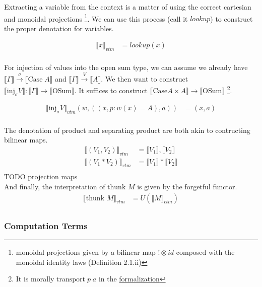\documentclass{article}
\newcommand{\den}[1]{\llbracket #1 \rrbracket}
\newcommand{\thunk}[1]{\textrm{thunk }#1}
\newcommand{\injj}[2]{\textrm{inj}_{#1}#2}
\begin{document}
Extracting a variable from the context is a matter of using the correct cartesian and monoidal projections
\footnote{monoidal projections given by a bilinear map $! \otimes id$ composed with the monoidal identity laws 
\cite{JACOBS199473}(Definition 2.1.ii)}. We can use this process (call it $lookup$) to construct the proper 
denotation for variables.

\begin{align*}
    \llbracket  x \rrbracket_{vtm} &= lookup(x) \\
\end{align*}

For injection of values into the open sum type, we can assume we already have 
$\den{\Gamma} \xrightarrow{\sigma} \den{\textrm{Case} \; A}$ and $\den{\Gamma} \xrightarrow{V} \den{A}$.
 We then want to construct $\den{\injj{\sigma}{V}} : \den{\Gamma} \rightarrow \den{\textrm{OSum}}$. 
It suffices to construct $\den{\textrm{Case} A \times A} \rightarrow \den{\textrm{OSum}}$
\footnote{It is morally $\textrm{transport} \; p \; a$ in the 
\href{https://github.com/bond15/Bunched-CBPV/blob/a2da10ec10f7bedcce8ded4aea6646b3a184d0b4/src/Models/FuturePast.agda#L264}
{formalization} }.

\begin{align*}
    \llbracket  \injj{\sigma}{V}\rrbracket_{vtm}(w, ((x , p : w(x)=A), a)) &= (x , a )\\
\end{align*}

The denotation of product and separating product are both akin to contructing bilinear maps.
\begin{align*}
    \llbracket  (V_1, V_2)\rrbracket_{vtm} &= \den{V_1} , \den{V_2}\\
    \llbracket  (V_1 * V_2)\rrbracket_{vtm} &= \den{V_1} * \den{V_2}\\
\end{align*}
TODO projection maps\\
And finally, the interpretation of $\thunk{M}$ is given by the forgetful functor.
\begin{align*}
    \llbracket  \thunk{M}\rrbracket_{vtm} &= U(\den{M}_{ctm})\\
\end{align*}

\subsubsection{Computation Terms}
\end{document}
